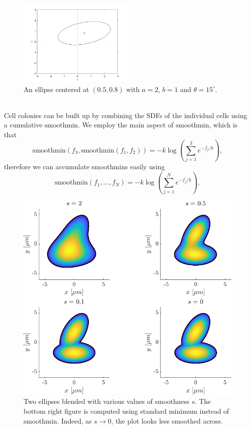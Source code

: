 \begin{figure}[h]
    \centering
    \includegraphics[width=0.5\textwidth]{chapter1/figures/ellipse_translated_rotated.jpg}
    \caption{An ellipse centered at $(0.5, 0.8)$ with $a = 2$, $b=1$ and $\theta = 15^{\circ}$.}
    \label{fig:Ellipse_Centered}
\end{figure}
\\
Cell colonies can be built up by combining the SDFs of the individual cells 
using a cumulative $\textrm{smoothmin}$. We employ the main aspect of 
$\textrm{smoothmin}$, which is that 
\begin{equation}
    \textrm{smoothmin}(f_3, \textrm{smoothmin}(f_1,f_2)) = -k \log( \sum_{j=1}^3 e^{-f_j/k}),
\end{equation}
therefore we can accumulate smoothmins easily using
\begin{equation}
    \textrm{smoothmin}(f_1, \ldots, f_N) = -k \log( \sum_{j=1}^N e^{-f_j/k}),
\end{equation}

\begin{figure}[!htb]
\centering
\includegraphics[width=\textwidth]{chapter1/figures/compareSmoothness.pdf}
\caption{Two ellipses blended with various values of smoothness $s$. The bottom right 
         figure is computed using standard minimum instead of smoothmin. Indeed,
         as $s \rightarrow 0$, the plot looks less smoothed across.}
\label{fig:compareSmoothness}
\end{figure}


